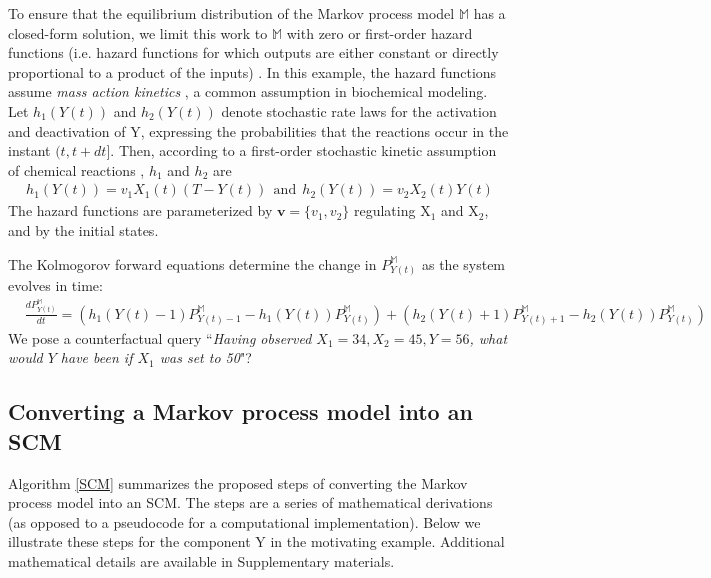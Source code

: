 \documentclass{article}
\begin{document}
To ensure that the equilibrium distribution of the Markov process model $\mathbb{M}$ has a closed-form solution, we limit this work to $\mathbb{M}$ with zero or first-order hazard functions (i.e. hazard functions for which outputs are either constant or directly proportional to a product of the inputs) \cite{jahnke2007solving, wilkinson2009stochastic}. In this example, the hazard functions assume {\it mass action kinetics} \cite{horn1972general}, a common assumption in biochemical modeling.  Let $h_1(Y(t))$ and $h_2(Y(t))$ denote stochastic rate laws for the activation and deactivation of $\mbox{Y}$, expressing the probabilities that the reactions occur in the instant $(t, t+dt]$. Then, according to a first-order stochastic kinetic assumption of chemical reactions \cite{wilkinson2006stochastic}, $h_1$ and $h_2$ are
\begin{eqnarray}
h_1(Y(t)) = v_1 X_1(t) (T- Y(t)) \ \ \mbox{and} \ \ h_2(Y(t)) = v_2 X_2(t)Y(t) \label{toy:hazard}
\end{eqnarray}
The hazard functions are parameterized by $\mathbf{v}=\{v_1,v_2\}$ regulating $\mbox{X}_1$ and $\mbox{X}_2$, and by the initial states. 

The Kolmogorov forward equations determine the change in $P^{\mathbb{M}}_{Y(t)}$ as the system evolves in time:
\vspace{-.1in}
\begin{eqnarray}
& \frac{dP^{\mathbb{M}}_{Y(t)}}{dt} = \left (h_1(Y(t) - 1)P^{\mathbb{M}}_{Y(t)-1} - h_1(Y(t))P^{\mathbb{M}}_{Y(t)} \right ) +  \left (h_2(Y(t) + 1)P^{\mathbb{M}}_{Y(t)+1} - h_2(Y(t))P^{\mathbb{M}}_{Y(t)} \right ) &   \label{dyn_prob}
\end{eqnarray}
We pose a counterfactual query ``\emph{Having observed $X_1 = 34, X_2 = 45, Y = 56$, what would $Y$ have been if $X_1$ was set to 50}"?

\subsection{Converting a Markov process model into an SCM \label{sec:SCM}}

Algorithm \ref{SCM} summarizes the proposed steps of converting the Markov process model into an SCM. The steps are a series of mathematical derivations  (as opposed to a pseudocode for a computational implementation). Below we illustrate these steps for the component $\mbox{Y}$ in the motivating example. Additional mathematical details are available in Supplementary materials.
\end{document}
